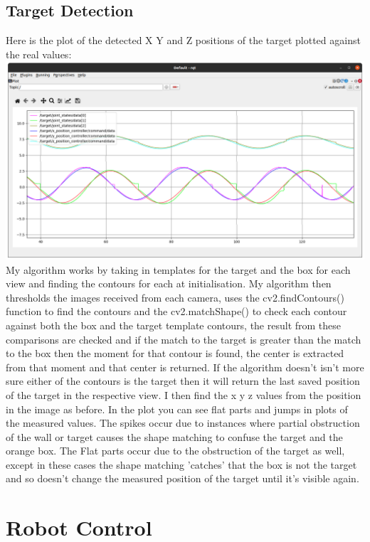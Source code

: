 \documentclass[12pt]{article}
\begin{document}
\subsection{Target Detection}
Here is the plot of the detected X Y and Z positions of the target plotted against the real values:\newline
\includegraphics[width=\textwidth]{target_tacking_plus_one.png}
My algorithm works by taking in templates for the target and the box for each view and finding the contours for each at initialisation.
My algorithm then thresholds the images received from each camera, uses the cv2.findContours() function to find the contours and the cv2.matchShape() to check each contour against both the box and the target template contours, the result from these comparisons are checked and if the match to the target is greater than the match to the box then the moment for that contour is found, the center is extracted from that moment and that center is returned. If the algorithm doesn't isn't more sure either of the contours is the target then it will return the last saved position of the target in the respective view. I then find the x y z values from the position in the image as before. \newline
In the plot you can see flat parts and jumps in plots of the measured values. The spikes occur due to instances where partial obstruction of the wall or target causes the shape matching to confuse the target and the orange box. The Flat parts occur due to the obstruction of the target as well, except in these cases the shape matching 'catches' that the box is not the target and so doesn't change the measured position of the target until it's visible again.
\newpage
\section{Robot Control}
\end{document}
